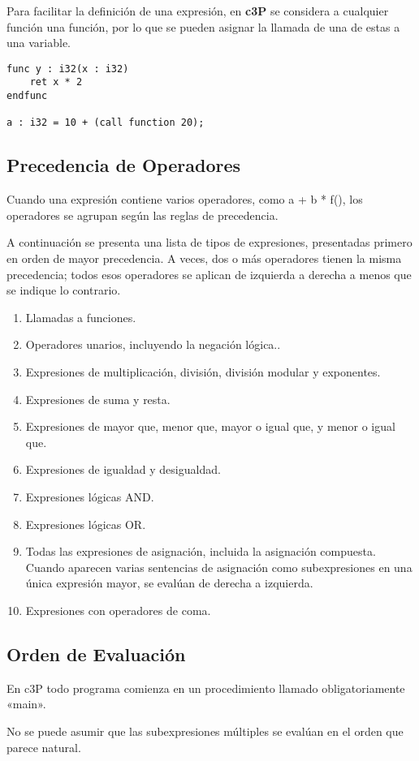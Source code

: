 Para facilitar la definición de una expresión, en \textbf{c3P} se considera a
cualquier función una función, por lo que se pueden asignar la llamada de una
de estas a una variable.

\begin{verbatim}
func y : i32(x : i32)
    ret x * 2
endfunc

a : i32 = 10 + (call function 20);
\end{verbatim}

\subsection{Precedencia de Operadores}

Cuando una expresión contiene varios operadores, como a + b * f(), los operadores se agrupan según las reglas de precedencia.

A continuación se presenta una lista de tipos de expresiones, presentadas primero en orden de mayor precedencia. A veces, dos o más operadores tienen la misma precedencia; todos esos operadores se aplican de izquierda a derecha a menos que se indique lo contrario.

\begin{enumerate}
  \item Llamadas a funciones.
  \item Operadores unarios, incluyendo la negación lógica..
  \item Expresiones de multiplicación, división, división modular y exponentes.
  \item Expresiones de suma y resta.
  \item Expresiones de mayor que, menor que, mayor o igual que, y menor o igual que.
  \item Expresiones de igualdad y desigualdad.
  \item Expresiones lógicas AND.
  \item Expresiones lógicas OR.
  \item Todas las expresiones de asignación, incluida la asignación compuesta. \newline Cuando aparecen varias sentencias de asignación como subexpresiones en una única expresión mayor, se evalúan de derecha a izquierda.
  \item Expresiones con operadores de coma. 
\end{enumerate}

\subsection{Orden de Evaluación}

En c3P todo programa comienza en un procedimiento llamado obligatoriamente «main». 

No se puede asumir que las subexpresiones múltiples se evalúan en el orden que parece natural.